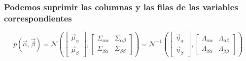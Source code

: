 \begin{frame}
    \frametitle{Podemos suprimir las columnas y las filas de las variables correspondientes}
    
    \scriptsize

    \begin{equation*}
        p(\vec{\alpha}, \vec{\beta}) = \mathcal{N} \left(
        \begin{bmatrix}
            \vec{\mu}_{\alpha} \\
            \vec{\mu}_{\beta}
            \end{bmatrix},
            \begin{bmatrix}
            \Sigma_{\alpha\alpha} & \Sigma_{\alpha\beta} \\
            \Sigma_{\beta\alpha} & \Sigma_{\beta\beta}
        \end{bmatrix}
        \right)
        = \mathcal{N}^{-1} \left(
        \begin{bmatrix}
            \vec{\eta}_{\alpha} \\
            \vec{\eta}_{\beta}
            \end{bmatrix},
            \begin{bmatrix}
            \Lambda_{\alpha\alpha} & \Lambda_{\alpha\beta} \\
            \Lambda_{\beta\alpha} & \Lambda_{\beta\beta}
        \end{bmatrix}
        \right)
    \end{equation*}
    

\end{frame}

